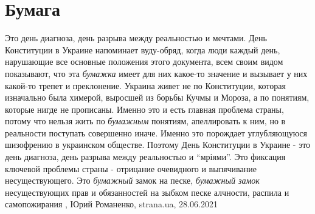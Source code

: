  
 
 
 
 
\chapter{Бумага}

Это день диагноза, день разрыва между реальностью и мечтами. День Конституции
в Украине напоминает вуду-обряд, когда люди каждый день, нарушающие все
основные положения этого документа, всем своим видом показывают, что эта
\emph{бумажка} имеет для них какое-то значение и вызывает у них какой-то трепет
и преклонение. Украина живет не по Конституции, которая изначально была
химерой, выросшей из борьбы Кучмы и Мороза, а по понятиям, которые нигде не
прописаны.  Именно это и есть главная проблема страны, потому что нельзя жить
по \emph{бумажным} понятиям, апеллировать к ним, но в реальности поступать
совершенно иначе.  Именно это порождает углубляющуюся шизофрению в украинском
обществе.  Поэтому День Конституции в Украине - это день диагноза, день разрыва
между реальностью и \enquote{мріями}. Это фиксация ключевой проблемы страны -
отрицание очевидного и выпячивание несуществующего. Это \emph{бумажный} замок
на песке, \emph{бумажный замок} несуществующих прав и обязанностей на зыбком
песке алчности, распила и самопожирания
, 
Юрий Романенко, strana.ua, 28.06.2021

